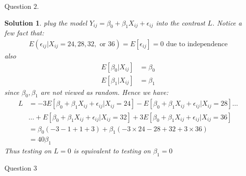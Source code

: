 \documentclass[11pt]{article}
\newtheorem{sol}{Solution}
\begin{document}
Question $2$.
\begin{sol}
	plug the model $Y_{ij} = \beta_0 + \beta_1X_{ij} + \epsilon_{ij}$ into the contrast $L$. Notice a few fact that:
	\begin{align*}
		E(\epsilon_{ij}| X_{ij} = 24, 28, 32, \text{ or }36) = E[\epsilon_{ij}] = 0 \text{ due to independence}
	\end{align*}
	also 
	\begin{align*}
		E[\beta_0|X_{ij}] &= \beta_0\\
		E[\beta_1|X_{ij}] &=  \beta_1
	\end{align*}
	since $\beta_0, \beta_1$ are not viewed as random.\vskip 2mm
	Hence we have:
	\begin{align*}
		L &= -3 E[\beta_0 + \beta_1X_{ij} + \epsilon_{ij}|X_{ij} = 24] - E[\beta_0 + \beta_1X_{ij} + \epsilon_{ij}|X_{ij} = 28] \ldots\\
		&\ldots + E[\beta_0 + \beta_1X_{ij} + \epsilon_{ij}|X_{ij} = 32] + 3E[\beta_0 + \beta_1X_{ij} + \epsilon_{ij}|X_{ij} = 36]\\
		&= \beta_0(-3-1+1+3) + \beta_1(-3\times 24 -28 + 32 + 3 \times 36)\\
		&= 40\beta_1
	\end{align*}
	Thus testing on $L = 0$ is equivalent to testing on $\beta_1 = 0$
\end{sol}
Question $3$
\end{document}
